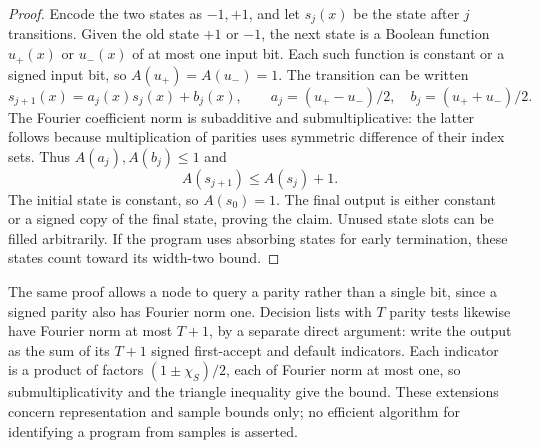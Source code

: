 \begin{proof}
Encode the two states as $-1,+1$, and let $s_j(x)$ be the state after
$j$ transitions. Given the old state $+1$ or $-1$, the next state is
a Boolean function $u_+(x)$ or $u_-(x)$ of at most one input bit.
Each such function is constant or a signed input bit, so
$A(u_+)=A(u_-)=1$. The transition can be written
\[
 s_{j+1}(x)=a_j(x)s_j(x)+b_j(x),\qquad
 a_j=(u_+-u_-)/2,\quad b_j=(u_++u_-)/2.
\]
The Fourier coefficient norm is subadditive and submultiplicative:
the latter follows because multiplication of parities uses symmetric
difference of their index sets. Thus $A(a_j),A(b_j)\le1$ and
\[
 A(s_{j+1})\le A(s_j)+1.
\]
The initial state is constant, so $A(s_0)=1$. The final output is
either constant or a signed copy of the final state, proving the claim.
Unused state slots can be filled arbitrarily. If the program uses
absorbing states for early termination, these states count toward its
width-two bound.
\end{proof}

The same proof allows a node to query a parity rather than a single
bit, since a signed parity also has Fourier norm one. Decision lists
with $T$ parity tests likewise have Fourier norm at most $T+1$, by a
separate direct argument: write the output as the sum of its $T+1$
signed first-accept and default indicators. Each indicator is a
product of factors $(1\pm\chi_S)/2$, each of Fourier norm at most
one, so submultiplicativity and the triangle inequality give the
bound. These extensions concern representation and sample bounds
only; no efficient algorithm for identifying a program from samples
is asserted.
